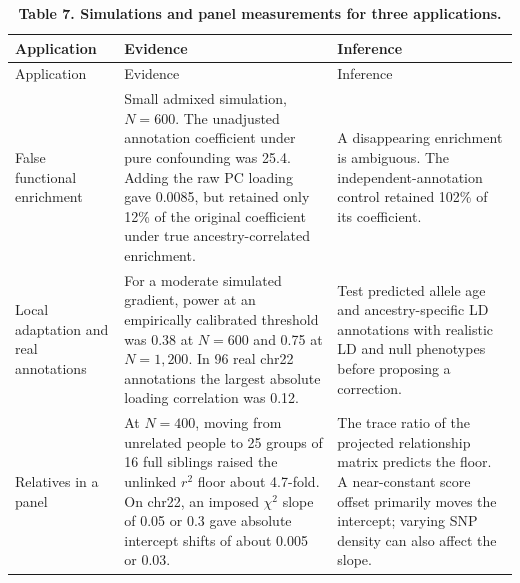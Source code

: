 \documentclass[11pt,a4paper]{article}
\begin{document}
\begin{longtable}[]{@{}
  >{\raggedright\arraybackslash}p{}
  >{\raggedright\arraybackslash}p{}
  >{\raggedright\arraybackslash}p{}@{}}
\caption{\textbf{Table 7. Simulations and panel measurements for three applications.}}\tabularnewline
\toprule\noalign{}
\begin{minipage}[b]{\linewidth}\raggedright
Application
\end{minipage} & \begin{minipage}[b]{\linewidth}\raggedright
Evidence
\end{minipage} & \begin{minipage}[b]{\linewidth}\raggedright
Inference
\end{minipage} \\
\midrule\noalign{}
\endfirsthead
\toprule\noalign{}
\begin{minipage}[b]{\linewidth}\raggedright
Application
\end{minipage} & \begin{minipage}[b]{\linewidth}\raggedright
Evidence
\end{minipage} & \begin{minipage}[b]{\linewidth}\raggedright
Inference
\end{minipage} \\
\midrule\noalign{}
\endhead
\bottomrule\noalign{}
\endlastfoot
False functional enrichment & Small admixed simulation, \(N=600\). The unadjusted annotation coefficient under pure confounding was 25.4. Adding the raw PC loading gave 0.0085, but retained only 12\% of the original coefficient under true ancestry-correlated enrichment. & A disappearing enrichment is ambiguous. The independent-annotation control retained 102\% of its coefficient. \\
Local adaptation and real annotations & For a moderate simulated gradient, power at an empirically calibrated threshold was 0.38 at \(N=600\) and 0.75 at \(N=1{,}200\). In 96 real chr22 annotations the largest absolute loading correlation was 0.12. & Test predicted allele age and ancestry-specific LD annotations with realistic LD and null phenotypes before proposing a correction. \\
Relatives in a panel & At \(N=400\), moving from unrelated people to 25 groups of 16 full siblings raised the unlinked \(r^2\) floor about 4.7-fold. On chr22, an imposed \(\chi^2\) slope of 0.05 or 0.3 gave absolute intercept shifts of about 0.005 or 0.03. & The trace ratio of the projected relationship matrix predicts the floor. A near-constant score offset primarily moves the intercept; varying SNP density can also affect the slope. \\
\end{longtable}
\end{document}
